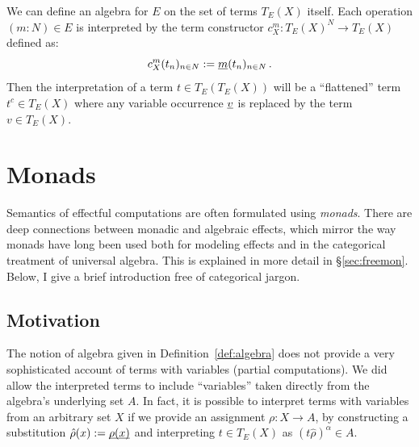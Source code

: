 \documentclass[11pt,oneside]{book}
\theoremstyle{definition}
\newcommand{\ul}[1]{%
  \underline{\smash{#1}}
}
\begin{document}
We can define an algebra for $E$ on the set of terms $T_E(X)$ itself.
Each operation $(m \mathbin: N) \in E$ is interpreted
by the term constructor $c^m_X : T_E(X)^N \rightarrow T_E(X)$
defined as:
\[
  c^m_X(t_n)_{n \in N} := \ul{m}(t_n)_{n \in N}
  \,.
\]
Then the interpretation of a term $t \in T_E(T_E(X))$
will be a ``flattened'' term $t^c \in T_E(X)$ where any
variable occurrence $\ul{v}$ is replaced by the term $v \in T_E(X)$.



\section{Monads} \label{sec:eff:mon} %

Semantics of effectful computations
are often formulated using \emph{monads}.
There are deep connections between
monadic and algebraic effects,
which mirror the way monads have long been used
both for modeling effects and
in the categorical treatment of universal algebra.
This is explained in more detail in \S\ref{sec:freemon}.
Below, I give a brief introduction
free of categorical jargon.

\subsection{Motivation} %

The notion of algebra
given in Definition~\ref{def:algebra}
does not provide a very sophisticated account
of terms with variables
(partial computations).
We did allow the interpreted terms to include ``variables''
taken directly from the algebra's underlying set $A$.
In fact, it is possible to interpret
terms with variables from an arbitrary set $X$
if we provide an assignment $\rho : X \rightarrow A$,
by constructing a substitution $\hat{\rho}(x) := \ul{\rho(x)}$
and interpreting $t \in T_E(X)$ as $(t \hat{\rho})^\alpha \in A$.
\end{document}
